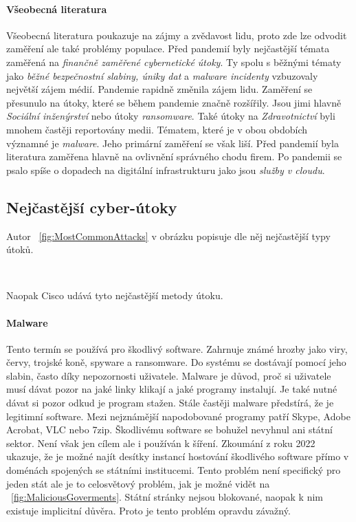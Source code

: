 \paragraph{Všeobecná literatura}
Všeobecná literatura poukazuje na zájmy a zvědavost lidu, proto zde lze odvodit zaměření ale také problémy populace.
Před pandemií byly nejčastější témata zaměřená na \textit{finančně zaměřené cybernetické útoky}.
Ty spolu s běžnými tématy jako \textit{běžné bezpečnostní slabiny, úniky dat} a \textit{malware incidenty} vzbuzovaly největší zájem médií.\cite{KUMAR2022102821}
Pandemie rapidně změnila zájem lidu.
Zaměření se přesunulo na útoky, které se během pandemie značně rozšířily.
Jsou jimi hlavně \textit{Sociální inženýrství} nebo útoky \textit{ransomware}.
Také útoky na \textit{Zdravotnictví} byli mnohem častěji reportovány medii.
Tématem, které je v obou obdobích významné je \textit{malware}.
Jeho primární zaměření se však liší.
Před pandemií byla literatura zaměřena hlavně na ovlivnění správného chodu firem.
Po pandemii se psalo spíše o dopadech na digitální infrastrukturu jako jsou \textit{služby v cloudu}.

\subsection{Nejčastější cyber-útoky}
Autor ~\ref{fig:MostCommonAttacks} v obrázku popisuje dle něj nejčastější typy útoků.

~\label{fig:MostCommonAttacks}




Naopak Cisco udává tyto nejčastější metody útoku.\cite{cisco_most_common_attack}

\paragraph{Malware}
Tento termín se používá pro škodlivý software.
Zahrnuje známé hrozby jako viry, červy, trojské koně, spyware a ransomware.
Do systému se dostávají pomocí jeho slabin, často díky nepozornosti uživatele.\cite{cisco_most_common_attack}
Malware je důvod, proč si uživatele musí dávat pozor na jaké linky klikají a jaké programy instalují.
Je také nutné dávat si pozor odkud je program stažen.
Stále častěji malware předstírá, že je legitimní software.
Mezi nejznámější napodobované programy patří Skype, Adobe Acrobat, VLC nebo 7zip.\cite{virustotal_report_findings}
Škodlivému software se bohužel nevyhnul ani státní sektor.
Není však jen cílem ale i používán k šíření.
Zkoumání z roku 2022 ukazuje, že je možné najít desítky instancí hostování škodlivého software přímo v doménách spojených se státními institucemi.\cite{virustotal_report_findings_goverment}
Tento problém není specifický pro jeden stát ale je to celosvětový problém, jak je možné vidět na ~\ref{fig:MaliciousGoverments}.
Státní stránky nejsou blokované, naopak k nim existuje implicitní důvěra.
Proto je tento problém opravdu závažný.

